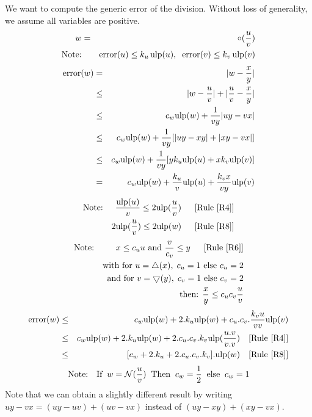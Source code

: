 \documentclass[12pt]{amsart}
\def\n{\textnormal}
\def\pinf{\bigtriangleup}
\def\minf{\bigtriangledown}
\def\ulp{{\rm ulp}}
\def\N{{\mathcal N}}
\newcommand{\U}[1]{\quad \mbox{[Rule~\ref{#1}]}}
\DeclareMathOperator{\error}{error}
\begin{document}
We want to compute the generic error of the division.
Without loss of generality, we assume all variables are positive.
\begin{eqnarray}\nonumber
w&=&\circ(\frac{u}{v}) \\\nonumber
\textnormal{Note:}&& \error(u) \leq k_u \, \ulp(u), \;\; \error(v) \leq k_v \, \ulp(v)
\end{eqnarray}
\begin{eqnarray}\nonumber
\error(w)& = &|w - \frac{x}{y}| \\\nonumber
& \leq &|w - \frac{u}{v}| +|\frac{u}{v} - \frac{x}{y}| \\\nonumber
& \leq & c_w \ulp(w) + \frac{1}{vy}|uy-vx| \\\nonumber
& \leq & c_w \ulp(w) + \frac{1}{vy}[|uy-xy|+|xy-vx| ]\\\nonumber
& \leq & c_w \ulp(w) + \frac{1}{vy}[y k_u \ulp(u)+ x k_v \ulp(v)]\\\nonumber
&   =  & c_w \ulp(w) + \frac{k_u}{v}  \ulp(u)+ \frac{k_v x}{vy} \ulp(v)
\end{eqnarray}
\begin{eqnarray}\nonumber
\textnormal{Note:}&& \frac{\ulp(u)}{v} \leq  2 \ulp(\frac{u}{v}) \;\; \U{R4}\\\nonumber
&& 2 \ulp(\frac{u}{v}) \leq  2 \ulp(w) \;\; \U{R8}
\end{eqnarray}
\begin{eqnarray}\nonumber
\textnormal{Note:}&& x \leq c_u u \textnormal{ and } \frac{v}{c_v} \leq y\;\; \U{R6}\\\nonumber
&&\n{with } \n{for } u=\pinf(x),\;c_u=1 \n{ else } c_u=2\\\nonumber
&&\n{ and }\n{for } v=\minf(y),\;c_v=1 \n{ else } c_v=2\\\nonumber
&& \n{then: } \frac{x}{y} \leq c_u c_v  \frac{u}{v}
\end{eqnarray}
\begin{eqnarray}\nonumber
\error(w)& \leq & c_w \ulp(w) + 2.k_u  \ulp(w)+ c_u.c_v.\frac{k_v u}{vv} \ulp(v)\\\nonumber
& \leq & c_w \ulp(w) + 2.k_u  \ulp(w)+ 2.c_u.c_v.k_v \ulp(\frac{u.v}{v.v}) \U{R4}\\\nonumber
& \leq & [c_w  + 2.k_u+ 2.c_u.c_v.k_v].\ulp(w) \U{R8}
\end{eqnarray}
\begin{eqnarray}\nonumber
\textnormal{Note:}&&\textnormal{If}\;\; w=\N(\frac{u}{v}) \;\;\textnormal{Then}\;\; c_w =\frac{1}{2} \;\;\textnormal{else}\;\; c_w =1
\end{eqnarray}
Note that we can obtain a slightly different result by writing
$uy-vx = (uy - uv) + (uv - vx)$ instead of $(uy-xy)+(xy-vx)$.
\end{document}
